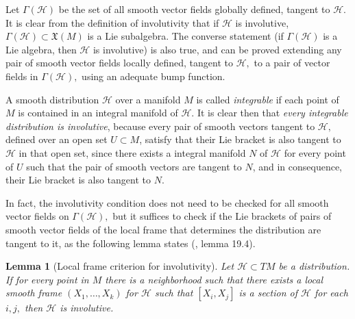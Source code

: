 \documentclass[12pt, letterpaper, reqno]{amsart}
\theoremstyle{definition}
\theoremstyle{plain}
\newtheorem{lm}{Lemma}
\theoremstyle{remark}
\begin{document}
Let $ \Gamma(\mathcal{H}) $ be the set of all smooth vector fields globally defined, tangent to $ \mathcal{H}. $ It is clear from the definition of involutivity that if $ \mathcal{H} $ is involutive, $ \Gamma (\mathcal{H})\subset \mathfrak{X}(M) $ is a Lie subalgebra. The converse statement (if $ \Gamma(\mathcal{H}) $ is a Lie algebra, then $ \mathcal{H} $ is involutive) is also true, and can be proved extending any pair of smooth vector fields locally defined, tangent to $ \mathcal{H} ,$ to a pair of vector fields in $ \Gamma( \mathcal{H}), $ using an adequate bump function. 

A smooth distribution $ \mathcal{H} $ over a manifold $ M $ is called \textit{integrable} if each point of $ M $ is contained in an integral manifold of $ \mathcal{H}. $  It is clear then that \textit{every integrable distribution is involutive}, because every pair of smooth vectors tangent to $ \mathcal{H}, $ defined over an open set $ U\subset M $, satisfy that their Lie bracket is also tangent to $ \mathcal{H} $ in that open set, since there exists a integral manifold $ N $  of $ \mathcal{H} $ for every point of $ U $ such that the pair of smooth vectors are tangent to $ N $, and in consequence, their Lie bracket is also tangent to $ N. $  

In fact, the involutivity condition does not need to be checked for all smooth vector fields on $ \Gamma( \mathcal{H}), $ but it suffices to check if the Lie brackets of pairs of smooth vector fields of the local frame that determines the distribution are tangent to it, as the following lemma states (\cite{lee2003introduction}, lemma 19.4).

\begin{lm}[Local frame criterion for involutivity] 
	Let $ \mathcal{H}\subset TM $ be a distribution. If for every point in $ M $ there is a neighborhood such that there exists a local smooth frame $ (X_1,\dots, X_k) $ for $ \mathcal{H} $ such that $ [X_i,X_j] $ is a section of $ \mathcal{H} $ for each $ i,j, $ then $ \mathcal{H} $ is involutive.
\end{lm}
\end{document}
